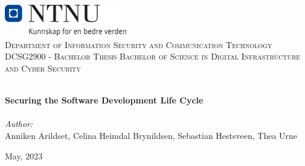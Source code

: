 \begin{titlepage}
\vbox{ }
\vbox{ }
\begin{center}
\includegraphics[width=0.40\textwidth]{Images/NTNU_logo.png}\\[1cm]
\textsc{\LARGE Department of Information Security and Communication Technology}\\[1.5cm]
\textsc{\Large DCSG2900 -  Bachelor Thesis Bachelor of Science in Digital Infrastructure and Cyber Security}\\[0.5cm]
\vbox{ }

\HRule \\[0.4cm]
{ \huge \bfseries Securing the Software Development Life Cycle}\\[0.4cm]
\HRule \\[1.5cm]

\large
\emph{Author:}\\
Anniken Arildset, Celina Heimdal Brynildsen, Sebastian Hestsveen, Thea Urne
\vfill

{\large May, 2023}
\end{center}
\end{titlepage}